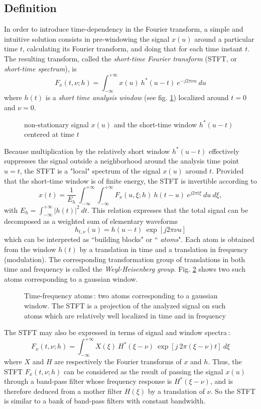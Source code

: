 \subsection{Definition}
  In order to introduce time-dependency in the Fourier transform, a simple
and intuitive solution consists in pre-windowing the signal $x(u)$ around a
particular time $t$, calculating its Fourier transform, and doing that for
each time instant $t$. The resulting transform, called the {\it short-time
Fourier transform} (STFT, or {\it short-time spectrum}), is
\[F_x(t,\nu;h) = \int_{-\infty}^{+\infty} x(u)\ h^*(u-t)\ e^{-j2\pi \nu u}\
du\] where $h(t)$ is a {\it short time analysis window} (see fig. \ref{At1fig1})
localized around $t=0$ and $\nu=0$.
\begin{figure}[htb]
\epsfxsize=10cm
\epsfysize=6cm
\centerline{}
\caption{\label{At1fig1}non-stationary signal $x(u)$ and the short-time
window $h^*(u-t)$ centered at time $t$}
\end{figure}
Because multiplication by the relatively short window $h^*(u-t)$
effectively suppresses the signal outside a neighborhood around the
analysis time point $u=t$, the STFT is a "local" spectrum of the signal
$x(u)$ around $t$. Provided that the short-time window is of finite energy,
the STFT is invertible according to
\[x(t) = \frac{1}{E_h}\ \int_{-\infty}^{+\infty} \int_{-\infty}^{+\infty}
F_x(u,\xi;h)\ h(t-u)\ e^{j2\pi t \xi}\ du\ d\xi,\] 
with $E_h=\int_{-\infty}^{+\infty} |h(t)|^2\ dt$.  This relation expresses
that the total signal can be decomposed as a weighted sum of elementary
waveforms
\[h_{t,\nu}(u) = h(u-t)\ \exp{[j2\pi \nu u]}\]
 which can be interpreted as ``building blocks" or ``{\it
atoms}". Each atom is obtained from the window $h(t)$ by a translation in
time and a translation in frequency (modulation). The corresponding
transformation group of translations in both time and frequency is called
the {\it Weyl-Heisenberg group}. \label{WHG} \index{Weyl-Heisenberg
group} Fig. \ref{At1fig2} shows two such atoms corresponding to a gaussian
window.
\begin{figure}[htb]
\epsfxsize=10cm
\epsfysize=6cm
\centerline{}
\caption{\label{At1fig2}Time-frequency atoms\,: two atoms corresponding to
a gaussian window. The STFT is a projection of the analyzed signal on such
atoms which are relatively well localized in time and in frequency}
\end{figure}
The STFT may also be expressed in terms of signal and window spectra\,:
\[F_x(t,\nu;h)=\int_{-\infty}^{+\infty} X(\xi)\ H^*(\xi-\nu)\ \exp{[j\
2\pi(\xi-\nu)t]}\ d\xi\] 
where $X$ and $H$ are respectively the Fourier transforms of $x$ and
$h$. Thus, the STFT $F_x(t,\nu;h)$ can be considered as the result of
passing the signal $x(u)$ through a band-pass filter whose frequency
response is $H^*(\xi-\nu)$, and is therefore deduced from a mother filter
$H(\xi)$ by a translation of $\nu$. So the STFT is similar to a bank of
band-pass filters with constant bandwidth.


